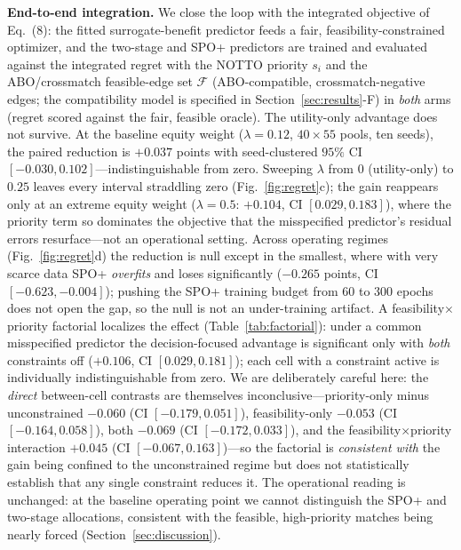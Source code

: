 \documentclass[journal]{IEEEtran}
\begin{document}
\par\textbf{End-to-end integration.} We close the loop with the integrated objective of Eq.~(8): the fitted surrogate-benefit predictor feeds a fair, feasibility-constrained optimizer, and the two-stage and SPO+ predictors are trained and evaluated against the integrated regret with the NOTTO priority $s_i$ and the ABO/crossmatch feasible-edge set $\mathcal{F}$ (ABO-compatible, crossmatch-negative edges; the compatibility model is specified in Section~\ref{sec:results}-F) in \emph{both} arms (regret scored against the fair, feasible oracle). The utility-only advantage does not survive. At the baseline equity weight ($\lambda=0.12$, $40\times55$ pools, ten seeds), the paired reduction is $+0.037$ points with seed-clustered $95\%$ CI $[-0.030,0.102]$---indistinguishable from zero. Sweeping $\lambda$ from $0$ (utility-only) to $0.25$ leaves every interval straddling zero (Fig.~\ref{fig:regret}c); the gain reappears only at an extreme equity weight ($\lambda{=}0.5$: $+0.104$, CI $[0.029,0.183]$), where the priority term so dominates the objective that the misspecified predictor's residual errors resurface---not an operational setting. Across operating regimes (Fig.~\ref{fig:regret}d) the reduction is null except in the smallest, where with very scarce data SPO+ \emph{overfits} and loses significantly ($-0.265$ points, CI $[-0.623,-0.004]$); pushing the SPO+ training budget from $60$ to $300$ epochs does not open the gap, so the null is not an under-training artifact. A feasibility$\times$priority factorial localizes the effect (Table~\ref{tab:factorial}): under a common misspecified predictor the decision-focused advantage is significant only with \emph{both} constraints off ($+0.106$, CI $[0.029,0.181]$); each cell with a constraint active is individually indistinguishable from zero. We are deliberately careful here: the \emph{direct} between-cell contrasts are themselves inconclusive---priority-only minus unconstrained $-0.060$ (CI $[-0.179,0.051]$), feasibility-only $-0.053$ (CI $[-0.164,0.058]$), both $-0.069$ (CI $[-0.172,0.033]$), and the feasibility$\times$priority interaction $+0.045$ (CI $[-0.067,0.163]$)---so the factorial is \emph{consistent with} the gain being confined to the unconstrained regime but does not statistically establish that any single constraint reduces it. The operational reading is unchanged: at the baseline operating point we cannot distinguish the SPO+ and two-stage allocations, consistent with the feasible, high-priority matches being nearly forced (Section~\ref{sec:discussion}).
\end{document}
